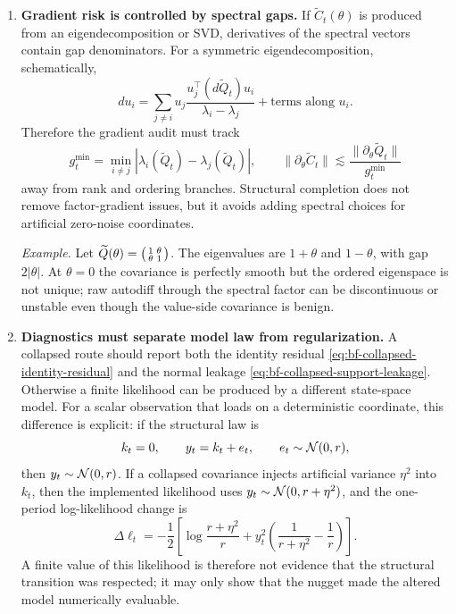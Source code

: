 \begin{enumerate}[label=(\roman*)]
  \item \textbf{Gradient risk is controlled by spectral gaps.}  If
    $\widetilde C_t(\theta)$ is produced from an eigendecomposition or SVD,
    derivatives of the spectral vectors contain gap denominators.  For a
    symmetric eigendecomposition, schematically,
    \[
      d u_i
      =
      \sum_{j\ne i}
      u_j
      \frac{u_j^\top(d\widetilde Q_t)u_i}{\lambda_i-\lambda_j}
      +\text{terms along }u_i .
      \label{eq:bf-collapsed-spectral-gap-gradient}
    \]
    Therefore the gradient audit must track
    \[
      g_t^{\min}
      =
      \min_{i\ne j}|\lambda_i(\widetilde Q_t)-\lambda_j(\widetilde Q_t)|,
      \qquad
      \|\partial_\theta\widetilde C_t\|
      \lesssim
      \frac{\|\partial_\theta\widetilde Q_t\|}{g_t^{\min}}
    \]
    away from rank and ordering branches.  Structural completion does not
    remove factor-gradient issues, but it avoids adding spectral choices for
    artificial zero-noise coordinates.

    \emph{Example.}  Let
    $\widetilde Q(\theta)=
    \begin{psmallmatrix}1&\theta\\ \theta&1\end{psmallmatrix}$.
    The eigenvalues are $1+\theta$ and $1-\theta$, with gap $2|\theta|$.
    At $\theta=0$ the covariance is perfectly smooth but the ordered
    eigenspace is not unique; raw autodiff through the spectral factor can be
    discontinuous or unstable even though the value-side covariance is benign.

  \item \textbf{Diagnostics must separate model law from regularization.}  A
    collapsed route should report both the identity residual
    \eqref{eq:bf-collapsed-identity-residual} and the normal leakage
    \eqref{eq:bf-collapsed-support-leakage}.  Otherwise a finite likelihood can
    be produced by a different state-space model.  For a scalar observation
    that loads on a deterministic coordinate, this difference is explicit:
    if the structural law is
    \[
      k_t=0,\qquad y_t=k_t+e_t,\qquad e_t\sim\mathcal{N}(0,r),
    \]
    then $y_t\sim\mathcal{N}(0,r)$.  If a collapsed covariance injects artificial
    variance $\eta^2$ into $k_t$, then the implemented likelihood uses
    $y_t\sim\mathcal{N}(0,r+\eta^2)$, and the one-period log-likelihood change is
    \[
      \Delta\ell_t
      =
      -\frac12
      \left[
        \log\frac{r+\eta^2}{r}
        +
        y_t^2
        \left(\frac{1}{r+\eta^2}-\frac{1}{r}\right)
      \right].
      \label{eq:bf-collapsed-nugget-likelihood-change}
    \]
    A finite value of this likelihood is therefore not evidence that the
    structural transition was respected; it may only show that the nugget made
    the altered model numerically evaluable.
\end{enumerate}

